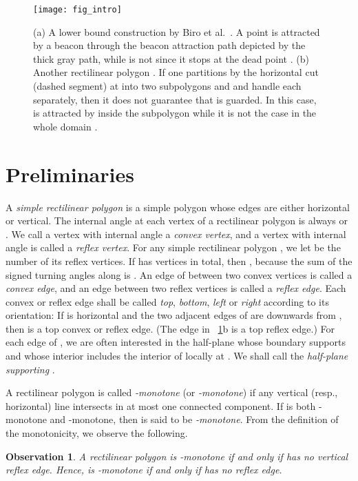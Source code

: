\documentclass[11pt]{article}
\newtheorem{observation}{Observation}
\theoremstyle{definition}
\begin{document}
\begin{figure}[tb]
\centering
\texttt{[image: fig\_intro]}
\caption{(a) A lower bound construction  by Biro et al.~\cite{bgikm-cccg-13}.
 A point  is attracted by a beacon  through the beacon attraction path
 depicted by the thick gray path, while  is not since it stops at the dead point .
 (b) Another rectilinear polygon . If one partitions  by the horizontal cut  (dashed segment) 
 at  into two subpolygons  and  and handle each separately,
 then it does not guarantee that  is guarded.
 In this case,  is attracted by  inside the subpolygon 
 while it is not the case in the whole domain .}
\label{fig:intro}
\end{figure}


\section{Preliminaries} \label{sec:pre}


A \emph{simple rectilinear polygon} is a simple polygon whose edges are either horizontal or vertical.
The internal angle at each vertex of a rectilinear polygon is always  or .
We call a vertex with internal angle  a \emph{convex vertex}, and a vertex with internal 
angle  is called a \emph{reflex vertex}.
For any simple rectilinear polygon , we let  be the number of its reflex vertices.
If  has  vertices in total, then , because the sum of the signed turning angles
along  is .
An edge of  between two  convex vertices is called a \emph{convex edge},
and an edge between two reflex vertices is called a \emph{reflex edge}.
Each convex or reflex edge  shall be called \emph{top}, \emph{bottom}, \emph{left} or \emph{right}
according to its orientation:
If  is horizontal and the two adjacent edges of  are downwards from ,
then  is a top convex or reflex edge.
(The edge  in \figurename~\ref{fig:intro}b is a top reflex edge.)
For each edge  of , we are often interested in the half-plane 
whose boundary supports  and whose interior includes the interior of  locally at .
We shall call  the \emph{half-plane supporting }.

A rectilinear polygon  is called \emph{-monotone} (or \emph{-monotone})
if any vertical (resp., horizontal) line intersects  in at most one connected component.
If  is both -monotone and -monotone, then  is said to be \emph{-monotone}.
From the definition of the monotonicity,
we observe the following.
\begin{observation} \label{obs:monotone}
A rectilinear polygon  is -monotone if and only if  has no vertical reflex edge.
Hence,  is -monotone if and only if  has no reflex edge.
\end{observation}
\end{document}

